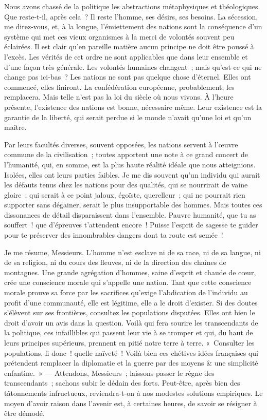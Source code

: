 \documentclass[twoside]{book} %
\newcommand\chapterclose{} %
\begin{document}
Nous avons chassé de la politique les abstractions métaphysiques et théologiques. Que reste-t-il, après cela ? Il reste l’homme, ses désirs, ses besoins. La sécession, me direz-vous, et, à la longue, l’émiettement des nations sont la conséquence d’un système qui met ces vieux organismes à la merci de volontés souvent peu éclairées. Il est clair qu’en pareille matière aucun principe ne doit être poussé à l’excès. Les vérités de cet ordre ne sont applicables que dans leur ensemble et d’une façon très générale. Les volontés humaines changent ; mais qu’est-ce qui ne change pas ici-bas ? Les nations ne sont pas quelque chose d’éternel. Elles ont commencé, elles finiront. La confédération européenne, probablement, les remplacera. Mais telle n’est pas la loi du siècle où nous vivons. À l’heure présente, l’existence des nations est bonne, nécessaire même. Leur existence est la garantie de la liberté, qui serait perdue si le monde n’avait qu’une loi et qu’un maître.\par
Par leurs facultés diverses, souvent opposées, les nations servent à l’œuvre commune de la civilisation ; toutes apportent une note à ce grand concert de l’humanité, qui, en somme, est la plus haute réalité idéale que nous atteignions. Isolées, elles ont leurs parties faibles. Je me dis souvent qu’un individu qui aurait les défauts tenus chez les nations pour des qualités, qui se nourrirait de vaine gloire ; qui serait à ce point jaloux, égoïste, querelleur ; qui ne pourrait rien supporter sans dégainer, serait le plus insupportable des hommes. Mais toutes ces dissonances de détail disparaissent dans l’ensemble. Pauvre humanité, que tu as souffert ! que d’épreuves t’attendent encore ! Puisse l’esprit de sagesse te guider pour te préserver des innombrables dangers dont ta route est semée !\par
Je me résume, Messieurs. L’homme n’est esclave ni de sa race, ni de sa langue, ni de sa religion, ni du cours des fleuves, ni de la direction des chaînes de montagnes. Une grande agrégation d’hommes, saine d’esprit et chaude de cœur, crée une conscience morale qui s’appelle une nation. Tant que cette conscience morale prouve sa force par les sacrifices qu’exige l’abdication de l’individu au profit d’une communauté, elle est légitime, elle a le droit d’exister. Si des doutes s’élèvent sur ses frontières, consultez les populations disputées. Elles ont bien le droit d’avoir un avis dans la question. Voilà qui fera sourire les transcendants de la politique, ces infaillibles qui passent leur vie à se tromper et qui, du haut de leurs principes supérieurs, prennent en pitié notre terre à terre. « Consulter les populations, fi donc ! quelle naïveté ! Voilà bien ces chétives idées françaises qui prétendent remplacer la diplomatie et la guerre par des moyens \& une simplicité enfantine. » — Attendons, Messieurs ; laissons passer le règne des transcendants ; sachons subir le dédain des forts. Peut-être, après bien des tâtonnements infructueux, reviendra-t-on à nos modestes solutions empiriques. Le moyen d’avoir raison dans l’avenir est, à certaines heures, de savoir se résigner à être démodé.
\chapterclose
\end{document}
